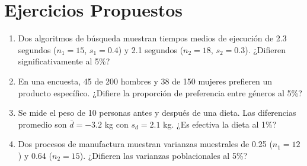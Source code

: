 \section{Ejercicios Propuestos}

\begin{enumerate}
    \item Dos algoritmos de búsqueda muestran tiempos medios de ejecución de 2.3 segundos ($n_1=15$, $s_1=0.4$) y 2.1 segundos ($n_2=18$, $s_2=0.3$). ¿Difieren significativamente al 5\%?
    
    \item En una encuesta, 45 de 200 hombres y 38 de 150 mujeres prefieren un producto específico. ¿Difiere la proporción de preferencia entre géneros al 5\%?
    
    \item Se mide el peso de 10 personas antes y después de una dieta. Las diferencias promedio son $\overline{d} = -3.2$ kg con $s_d = 2.1$ kg. ¿Es efectiva la dieta al 1\%?
    
    \item Dos procesos de manufactura muestran varianzas muestrales de 0.25 ($n_1=12$) y 0.64 ($n_2=15$). ¿Difieren las varianzas poblacionales al 5\%?
\end{enumerate}
